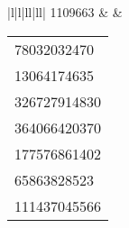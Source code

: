 \documentclass[a4paper, 14pt]{report}
\begin{document}
\begin{table}[h]
\begin{tabular}{|l|l|ll|ll|}
        1109663                                                                                                                                                          &
         &
        \begin{tabular}[c]{@{}l@{}}78032032470\\ 13064174635\\ 326727914830\\ 364066420370\\ 177576861402\\ 65863828523\\ 111437045566\end{tabular}                        \\ \hline
    \end{tabular}
\end{table}
\end{document}

